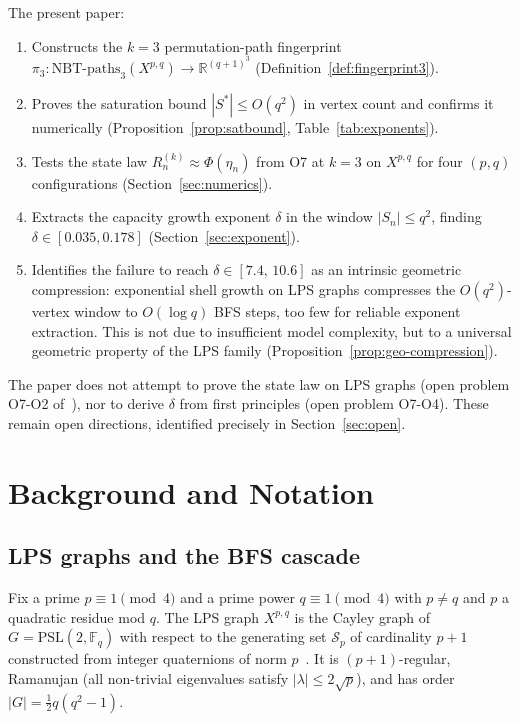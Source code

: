 \documentclass[11pt,a4paper]{article}
\theoremstyle{definition}
\theoremstyle{remark}
\newcommand{\R}{\mathbb{R}}
\newcommand{\F}{\mathbb{F}}
\newcommand{\Rn}{R_n^{(k)}}
\newcommand{\etan}{\eta_n}
\newcommand{\PSL}{\mathrm{PSL}}
\begin{document}
    The present paper:
    \begin{enumerate}[nosep]
  \item Constructs the $k = 3$ permutation-path fingerprint
  $\pi_3 : \mathrm{NBT\text{-}paths}_3(X^{p,q}) \to \R^{(q+1)^3}$
  (Definition~\ref{def:fingerprint3}).
  \item Proves the saturation bound $|S^*| \leq O(q^2)$ in vertex count
  and confirms it numerically (Proposition~\ref{prop:satbound},
  Table~\ref{tab:exponents}).
  \item Tests the state law $\Rn \approx \Phi(\etan)$ from O7 at $k = 3$
  on $X^{p,q}$ for four $(p,q)$ configurations (Section~\ref{sec:numerics}).
  \item Extracts the capacity growth exponent $\delta$ in the window
  $|S_n| \leq q^2$, finding $\delta \in [0.035, 0.178]$
  (Section~\ref{sec:exponent}).
  \item Identifies the failure to reach $\delta \in [7.4,\,10.6]$ as an
  intrinsic geometric compression: exponential shell growth on LPS graphs
  compresses the $O(q^2)$-vertex window to $O(\log q)$ BFS steps,
  too few for reliable exponent extraction.
  This is not due to insufficient model complexity, but to a universal
  geometric property of the LPS family (Proposition~\ref{prop:geo-compression}).
    \end{enumerate}

    The paper does not attempt to prove the state law on LPS graphs (open problem O7-O2
    of~\cite{Beau2026a11}), nor to derive $\delta$ from first principles (open problem O7-O4).
    These remain open directions, identified precisely in Section~\ref{sec:open}.

  \section{Background and Notation}
  \label{sec:background}

  \subsection{LPS graphs and the BFS cascade}
    \label{sec:background-lps}

    Fix a prime $p \equiv 1 \pmod 4$ and a prime power $q \equiv 1 \pmod 4$ with $p \neq q$
    and $p$ a quadratic residue mod $q$.
    The LPS graph $X^{p,q}$ is the Cayley graph of $G = \PSL(2, \F_q)$ with respect to the
    generating set $\mathcal{S}_p$ of cardinality $p+1$ constructed from integer quaternions
    of norm $p$~\cite{LPS}.
    It is $(p+1)$-regular, Ramanujan (all non-trivial eigenvalues satisfy
    $|\lambda| \leq 2\sqrt{p}$), and has order $|G| = \frac{1}{2}q(q^2-1)$.
\end{document}
